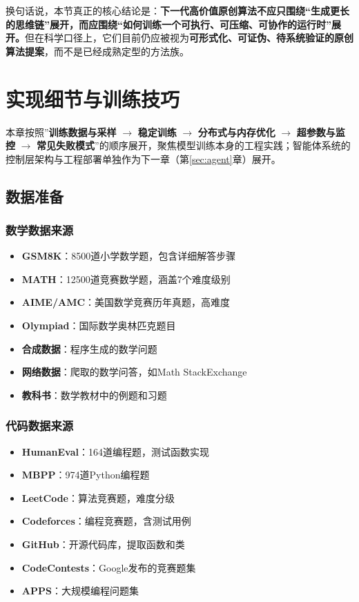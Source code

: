 \documentclass[12pt,a4paper]{article}
\begin{document}
换句话说，本节真正的核心结论是：\textbf{下一代高价值原创算法不应只围绕“生成更长的思维链”展开，而应围绕“如何训练一个可执行、可压缩、可协作的运行时”展开。}但在科学口径上，它们目前仍应被视为\textbf{可形式化、可证伪、待系统验证的原创算法提案}，而不是已经成熟定型的方法族。

\section{实现细节与训练技巧}

本章按照”\textbf{训练数据与采样} $\rightarrow$ \textbf{稳定训练} $\rightarrow$ \textbf{分布式与内存优化} $\rightarrow$ \textbf{超参数与监控} $\rightarrow$ \textbf{常见失败模式}”的顺序展开，聚焦模型训练本身的工程实践；智能体系统的控制层架构与工程部署单独作为下一章（第\ref{sec:agent}章）展开。

\subsection{数据准备}

\subsubsection{数学数据来源}

\begin{itemize}
    \item \textbf{GSM8K}：8500道小学数学题，包含详细解答步骤
    \item \textbf{MATH}：12500道竞赛数学题，涵盖7个难度级别
    \item \textbf{AIME/AMC}：美国数学竞赛历年真题，高难度
    \item \textbf{Olympiad}：国际数学奥林匹克题目
    \item \textbf{合成数据}：程序生成的数学问题
    \item \textbf{网络数据}：爬取的数学问答，如Math StackExchange
    \item \textbf{教科书}：数学教材中的例题和习题
\end{itemize}

\subsubsection{代码数据来源}

\begin{itemize}
    \item \textbf{HumanEval}：164道编程题，测试函数实现
    \item \textbf{MBPP}：974道Python编程题
    \item \textbf{LeetCode}：算法竞赛题，难度分级
    \item \textbf{Codeforces}：编程竞赛题，含测试用例
    \item \textbf{GitHub}：开源代码库，提取函数和类
    \item \textbf{CodeContests}：Google发布的竞赛题集
    \item \textbf{APPS}：大规模编程问题集
\end{itemize}
\end{document}
